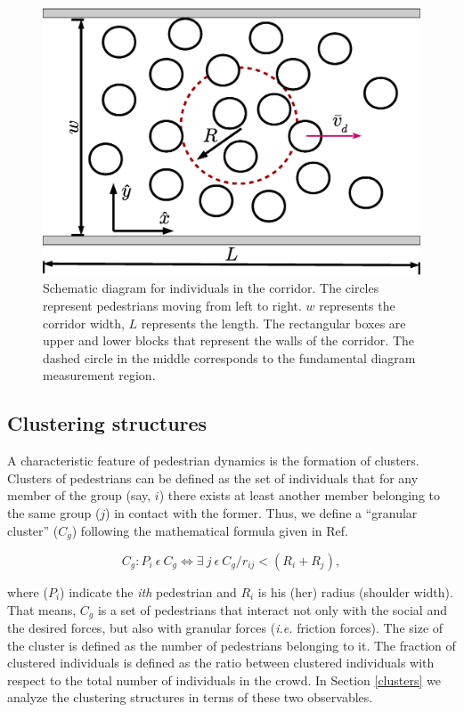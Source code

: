 \documentclass[preprint,12pt]{elsarticle}
\begin{document}
\begin{figure}[htbp!]
\centering
\includegraphics[width=0.7\columnwidth]
{./corridor.eps}
\caption{\label{corridor} Schematic diagram for individuals in the corridor. 
The circles represent pedestrians moving from left to right. $w$ represents the 
corridor width, $L$ represents the length. The rectangular boxes are upper and 
lower blocks that represent the walls of the corridor. The dashed circle in the 
middle corresponds to the fundamental diagram measurement region.}
\end{figure}

\subsection{\label{granular-cluster} Clustering structures}

A characteristic feature of pedestrian dynamics is the formation of clusters. Clusters of pedestrians can 
be defined as the set of individuals that for any member of the group (say, $i$) there exists at least another member belonging to the same group ($j$) in contact with the former. Thus, we define a ``granular cluster'' ($C_g$) following the mathematical formula given in Ref.~\cite{Dorso1}

\begin{equation}
C_g:P_i~\epsilon~ C_g \Leftrightarrow \exists~ j~\epsilon~C_g / r_{ij} < (R_i+R_j), \label{ec-cluster}
\end{equation}

where ($P_i$) indicate the \textit{ith} pedestrian and $R_i$ is his (her) radius 
(shoulder width). That means, $C_g$ is a set of pedestrians that interact not 
only with the social and the desired forces, but also with granular forces 
(\textit{i.e.} friction forces). The size of the cluster is defined as the 
number of pedestrians belonging to it. The fraction of clustered individuals is 
defined as the ratio between clustered individuals with respect to the total 
number of individuals in the crowd. In Section \ref{clusters} we analyze the 
clustering structures in terms of these two observables. \\
\end{document}
